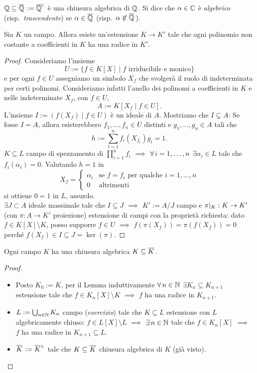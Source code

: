 \begin{esem}
$\Q\subseteq\calg{\Q}:=\calg[\C]{\Q}$ è una chiusura algebrica di $\Q$. Si dice che $\alpha\in\C$ è {\em algebrico} (risp.\ {\em trascendente}) se $\alpha\in\calg{\Q}$ (risp.\ $\alpha\not\in\calg{\Q}$).
\end{esem}

\begin{lemm}
Sia $K$ un campo. Allora esiste un'estensione $K \to K'$ tale che ogni polinomio non costante a coefficienti in $K$ ha una radice in $K'$.
\end{lemm}

\begin{proof}
Consideriamo l'insieme 
\[U:=\{f \in K[X] \mid f \text{ irriducibile e monico}\}\]
e per ogni $f \in U$ assegniamo un simbolo $X_f$ che svolgerà il ruolo di indeterminata per certi polinomi. Consideriamo infatti l'anello dei polinomi a coefficienti in $K$ e nelle indeterminate $X_f$, con $f \in U$, 
\[A:=K\left[X_f \mid f \in U\right] .\]
 L'insieme $I:= \left(f(X_f) \mid f\in U\right)$ è un ideale di $A$. Mostriamo che $I \subsetneq A$: Se fosse $I = A$, allora esisterebbero $f_1, \dots{}, f_n \in U$ distinti e $g_1,\dots,g_n\in A$ tali che
\[ h:=\sum_{l=1}^nf_i\left(X_{f_i}\right)g_i=1. \]
$K\subseteq L$ campo di spezzamento di $\prod_{i=1}^nf_i$ $\implies$ $\all i=1,\dots,n$ $\exi\alpha_i\in L$ tale che $f_i(\alpha_i)=0$. Valutando $h=1$ in
\[
X_f=
\begin{cases}
\alpha_i & \text{se $f=f_i$ per qualche $i=1,\dots,n$} \\
0 & \text{altrimenti}  
\end{cases}
\]
si ottiene $0=1$ in $L$, assurdo. \\
$\exi J\subset A$ ideale massimale tale che $I\subseteq J$ $\implies$ $K':=A/J$ campo e $\pi\rest{K} : K\to K'$ (con $\pi : A\to K'$ proiezione) estensione di campi con la propriet\`a richiesta: dato $f\in K[X]\setminus K$, posso supporre $f\in U$ $\implies$ $f(\pi(X_f))=\pi(f(X_f))=0$ perché $f(X_f)\in I\subseteq J=\ker(\pi)$.
\end{proof}

\begin{teor}
Ogni campo $K$ ha una chiusura algebrica $K\subseteq\calg{K}$.
\end{teor}

\begin{proof}
\begin{itemize}
\item Posto $K_0:=K$, per il Lemma induttivamente $\all n\in\N$ $\exi K_n\subseteq K_{n+1}$ estensione tale che $f\in K_n[X]\setminus K$ $\implies$ $f$ ha una radice in $K_{n+1}$.
\item $L:=\bigcup_{n\in\N}K_n$ campo ({\em esercizio}) tale che $K\subseteq L$ estensione con $L$ algebricamente chiuso: $f\in L[X]\setminus L$ $\implies$ $\exi n\in\N$ tale che $f\in K_n[X]$ $\implies$ $f$ ha una radice in $K_{n+1}\subseteq L$.
\item $\calg{K}:=\calg[L]{K}$ tale che $K\subseteq\calg{K}$ chiusura algebrica di $K$ (gi\`a visto). \qedhere
\end{itemize}
\end{proof}


